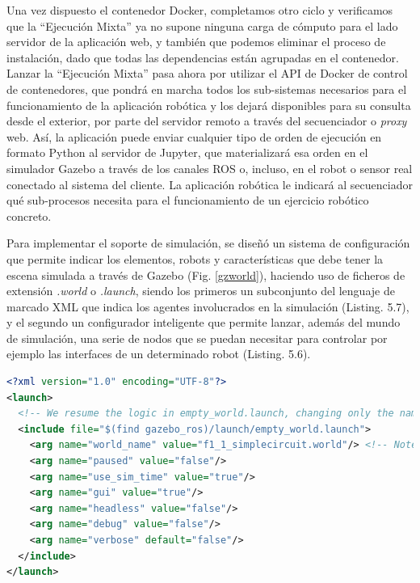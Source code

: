 Una vez dispuesto el contenedor Docker, completamos otro ciclo y verificamos que la ``Ejecución Mixta'' ya no supone ninguna carga de cómputo para el lado servidor de la aplicación web, y también que podemos eliminar el proceso de instalación, dado que todas las dependencias están agrupadas en el contenedor. Lanzar la ``Ejecución Mixta'' pasa ahora por utilizar el API de Docker de control de contenedores, que pondrá en marcha todos los sub-sistemas necesarios para el funcionamiento de la aplicación robótica y los dejará disponibles para su consulta desde el exterior, por parte del servidor remoto a través del secuenciador o \textit{proxy} web. Así, la aplicación puede enviar cualquier tipo de orden de ejecución en formato Python al servidor de Jupyter, que materializará esa orden en el simulador Gazebo a través de los canales ROS o, incluso, en el robot o sensor real conectado al sistema del cliente. La aplicación robótica le indicará al secuenciador qué sub-procesos necesita para el funcionamiento de un ejercicio robótico concreto.

Para implementar el soporte de simulación, se diseñó un sistema de configuración que permite indicar los elementos, robots y características que debe tener la escena simulada a través de Gazebo (Fig. \ref{gzworld}), haciendo uso de ficheros de extensión \textit{.world} o \textit{.launch}, siendo los primeros un subconjunto del lenguaje de marcado XML que indica los agentes involucrados en la simulación (Listing. 5.7), y el segundo un configurador inteligente que permite lanzar, además del mundo de simulación, una serie de nodos que se puedan necesitar para controlar por ejemplo las interfaces de un determinado robot (Listing. 5.6). 

\begin{lstlisting}[language=XML, caption=Configuración de Lanzamiento de Simulaciones]
<?xml version="1.0" encoding="UTF-8"?>
<launch>
  <!-- We resume the logic in empty_world.launch, changing only the name of the world to be launched -->
  <include file="$(find gazebo_ros)/launch/empty_world.launch">
    <arg name="world_name" value="f1_1_simplecircuit.world"/> <!-- Note: the world_name is with respect to GAZEBO_RESOURCE_PATH environmental variable -->
    <arg name="paused" value="false"/>
    <arg name="use_sim_time" value="true"/>
    <arg name="gui" value="true"/>
    <arg name="headless" value="false"/>
    <arg name="debug" value="false"/>
    <arg name="verbose" default="false"/>
  </include>  
</launch>
\end{lstlisting}

